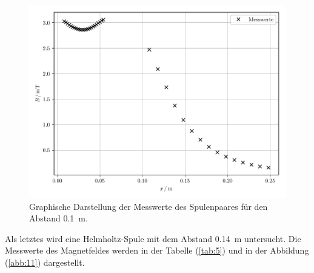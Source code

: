 \begin{figure}[H]
  \includegraphics{plot4.pdf}
  \caption{Graphische Darstellung der Messwerte des Spulenpaares für den Abstand \SI{0.1}{\meter}.}
  \label{abb:10}
\end{figure}

Als letztes wird eine Helmholtz-Spule mit dem Abstand \SI{0.14}{\meter} untersucht.
Die Messwerte des Magnetfeldes werden in der Tabelle (\ref{tab:5}) und in der Abbildung
(\ref{abb:11}) dargestellt.

